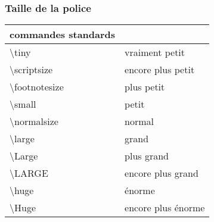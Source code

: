 \begin{frame}

	\frametitle{Taille de la police}
		
	\begin{center}
		\begin{tabular}{ll}
			\hline\hline
			\textbf{commandes standards}	&									\\
			\hline
			\textbackslash tiny				&	{\tiny vraiment petit} 			\\
			\textbackslash scriptsize		&	{\scriptsize encore plus petit}	\\
			\textbackslash footnotesize		&	{\footnotesize plus petit}		\\
			\textbackslash small			&	{\small petit}					\\
			\textbackslash normalsize		&	{\normalsize normal}			\\
			\textbackslash large			&	{\large grand}					\\
			\textbackslash Large			&	{\Large plus grand}				\\
			\textbackslash LARGE			&	{\LARGE encore plus grand}		\\
			\textbackslash huge				&	{\huge énorme} 					\\
			\textbackslash Huge				&	{\Huge encore plus énorme}		\\
			\hline\hline
		\end{tabular}
	\end{center}
\end{frame}


